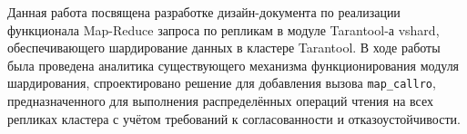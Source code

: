 \abstract

Данная работа посвящена разработке дизайн-документа по реализации функционала
Map-Reduce запроса по репликам в модуле Tarantool-а vshard, обеспечивающего
шардирование данных в кластере Tarantool. В ходе работы была проведена
аналитика существующего механизма функционирования модуля шардирования,
спроектировано решение для добавления вызова \texttt{map\_callro},
предназначенного для выполнения распределённых операций чтения на всех репликах
кластера с учётом требований к согласованности и отказоустойчивости.
